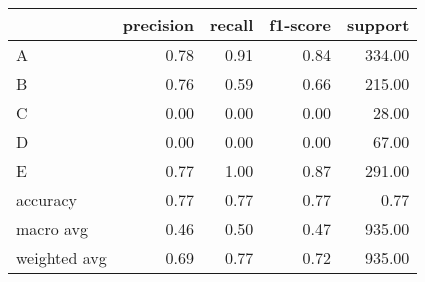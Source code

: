 \begin{tabular}{|l|r|r|r|r|}
\hline
{} &  precision &  recall &  f1-score &  support \\
\hline
A            &       0.78 &    0.91 &      0.84 &   334.00 \\
B            &       0.76 &    0.59 &      0.66 &   215.00 \\
C            &       0.00 &    0.00 &      0.00 &    28.00 \\
D            &       0.00 &    0.00 &      0.00 &    67.00 \\
E            &       0.77 &    1.00 &      0.87 &   291.00 \\
accuracy     &       0.77 &    0.77 &      0.77 &     0.77 \\
macro avg    &       0.46 &    0.50 &      0.47 &   935.00 \\
weighted avg &       0.69 &    0.77 &      0.72 &   935.00 \\
\hline
\end{tabular}
